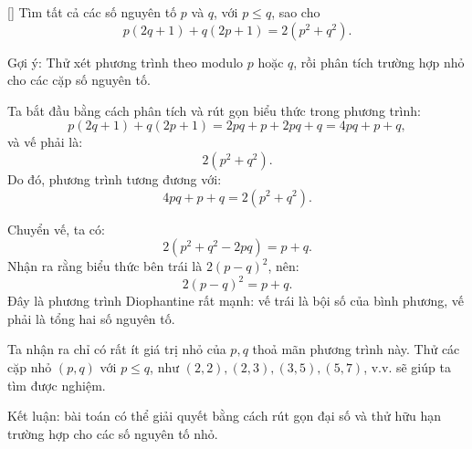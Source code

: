 \documentclass[../04-diophantine-equations.tex]{subfiles}
\begin{document}
\begin{exercise*}\label{example:ROU-2014-MO-G7-P1}[\textbf{}]
    Tìm tất cả các số nguyên tố \( p \) và \( q \), với \( p \le q \), sao cho
    \[
        p(2q + 1) + q(2p + 1) = 2(p^2 + q^2).
    \]
\end{exercise*}

\begin{remark*}
    Gợi ý: Thử xét phương trình theo modulo \(p\) hoặc \(q\), rồi phân tích trường hợp nhỏ cho các cặp số nguyên tố.
\end{remark*}

\begin{story*}
    Ta bắt đầu bằng cách phân tích và rút gọn biểu thức trong phương trình:
    \[
        p(2q + 1) + q(2p + 1) = 2pq + p + 2pq + q = 4pq + p + q,
    \]
    và vế phải là:
    \[
        2(p^2 + q^2).
    \]
    Do đó, phương trình tương đương với:
    \[
        4pq + p + q = 2(p^2 + q^2).
    \]

    Chuyển vế, ta có:
    \[
        2(p^2 + q^2 - 2pq) = p + q.
    \]
    Nhận ra rằng biểu thức bên trái là \(2(p - q)^2\), nên:
    \[
        2(p - q)^2 = p + q.
    \]
    Đây là phương trình Diophantine rất mạnh: vế trái là bội số của bình phương, vế phải là tổng hai số nguyên tố.

    Ta nhận ra chỉ có rất ít giá trị nhỏ của \(p, q\) thoả mãn phương trình này. Thử các cặp nhỏ \((p, q)\) với \(p \le q\), như \((2, 2), (2, 3), (3, 5), (5, 7)\), v.v. sẽ giúp ta tìm được nghiệm.

    Kết luận: bài toán có thể giải quyết bằng cách rút gọn đại số và thử hữu hạn trường hợp cho các số nguyên tố nhỏ.
\end{story*}
\end{document}
